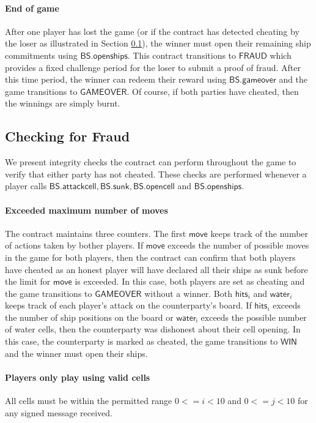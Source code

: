 \documentclass{llncs}
\newcommand{\gamewinner}{\mathsf{WIN}}
\newcommand{\gamefraud}{\mathsf{FRAUD}}
\newcommand{\gamefinished}{\mathsf{GAMEOVER}}
\newcommand{\battleshipattackcell}{\mathsf{BS.attackcell}}
\newcommand{\battleshiprevealcell}{\mathsf{BS.opencell}}
\newcommand{\battleshipsinking}{\mathsf{BS.sunk}}
\newcommand{\battleshiprevealships}{\mathsf{BS.openships}}
\newcommand{\battleshipgameover}{\mathsf{BS.gameover}}
\begin{document}
\paragraph{End of game} 
After one player has lost the game (or if the contract has detected cheating by the loser as illustrated in Section \ref{sec:fraud}), the winner must open their remaining ship commitments using $\battleshiprevealships$.
This contract transitions to $\gamefraud$ which provides a fixed challenge period for the loser to submit a proof of fraud. 
After this time period, the winner can redeem their reward using $\battleshipgameover$  and the game  transitions to $\gamefinished$. 
Of course, if both parties have cheated, then the winnings are simply burnt. 

\subsection{Checking for Fraud} \label{sec:fraud}

We present integrity checks the contract can perform throughout the game to verify that either party has not cheated. 
These checks are performed whenever a player calls $\battleshipattackcell, \battleshipsinking, \battleshiprevealcell$ and $\battleshiprevealships$.


\paragraph{Exceeded maximum number of moves} 
The contract maintains three counters.
The first $\mathsf{move}$ keeps track of the number of actions taken by bother players.
If $\mathsf{move}$ exceeds the number of possible moves in the game for both players, then the contract can confirm that both players have cheated as an honest player will have declared all their ships as sunk before the limit for $\mathsf{move}$ is exceeded.
In this case, both players are set as cheating and the game transitions to $\gamefinished$ without a winner. 
Both $\mathsf{hits}_{i}$ and $\mathsf{water}_{i}$ keeps track of each player's attack on the counterparty's board. 
If $\mathsf{hits}_{i}$ exceeds the number of ship positions on the board or $\mathsf{water_{i}}$ exceeds the possible number of water cells, then the counterparty was dishonest about their cell opening. 
In this case, the counterparty is marked as cheated, the game transitions to $\gamewinner$ and the winner must open their ships.  

\paragraph{Players only play using valid cells}  
All cells must be within the permitted range $0 <= i < 10$ and $0 <= j < 10$ for any signed message received. 
\end{document}
